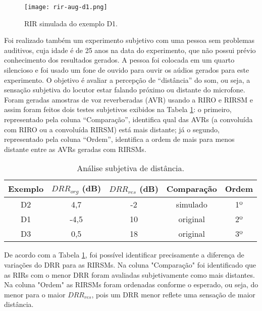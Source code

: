 \begin{figure} [H]
    \centering
    \texttt{[image: rir-aug-d1.png]}
    \caption{RIR simulada do exemplo D1.}
    \label{fig:rir-aug-d1}
\end{figure} 

Foi realizado também um experimento subjetivo com uma pessoa sem problemas auditivos, cuja idade é de 25 anos na data do experimento,  
que não possui prévio conhecimento dos resultados gerados.
A pessoa foi colocada em um quarto silencioso e foi usado um fone de ouvido para ouvir os aúdios gerados para este experimento.
O objetivo é avaliar a percepção de “distância” do som, ou seja, a sensação subjetiva do locutor estar falando próximo ou distante
do microfone.
Foram geradas amostras de voz reverberadas (AVR) usando a RIRO e RIRSM e assim foram feitos dois testes subjetivos exibidos na Tabela \ref{tbl:drr-exp}:
o primeiro, representado pela coluna “Comparação”, identifica qual das AVRs (a convoluída com RIRO ou a convoluída RIRSM) está mais distante;
já o segundo, representado pela coluna “Ordem”, identifica a ordem de mais para menos distante entre as AVRs geradas com RIRSMs.

\begin{table} [H]
    \centering
    \caption{Análise subjetiva de distância.}
    \label{tbl:drr-exp}
    \begin{tabular}{c|c|c|c|c}

        \textbf{Exemplo} & 
        \textbf{$DRR_{org}$ (dB)} & 
        \textbf{$DRR_{res}$ (dB)} & 
        \textbf{Comparação} &
        \textbf{Ordem} \\
        \hline 

        D2 & 4,7 & -2 & simulado & 1º \\
        D1 & -4,5 & 10 & original & 2º \\
        D3 & 0,5 & 18 & original & 3º \\

    \end{tabular}
\end{table}

De acordo com a Tabela \ref{tbl:drr-exp}, foi possível identificar precisamente a diferença de variações do DRR para as RIRSMs.
Na coluna "Comparação" foi identificado que as RIRs com o menor DRR foram avaliadas subjetivamente como mais distantes.
Na coluna "Ordem" as RIRSMs foram ordenadas conforme o esperado, ou seja, do menor para o maior $DRR_{res}$, pois um DRR menor reflete uma sensação
de maior distância.


